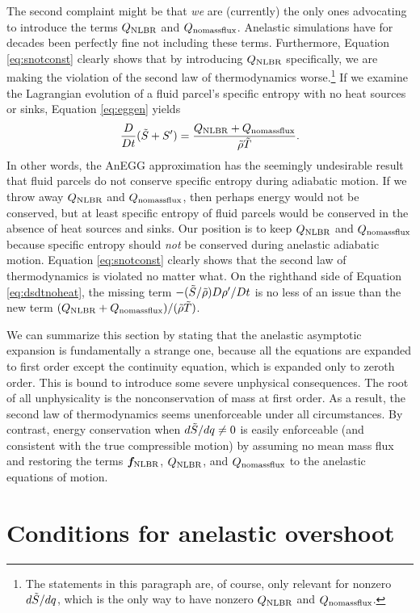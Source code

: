 \documentclass[12pt]{article}
\newcommand{\heatnlbr}{Q_{\rm NLBR}}
\newcommand{\forcenlbr}{\bm{f}_{\rm NLBR}}
\newcommand{\heatnomassflux}{Q_{\rm nomassflux}}
\begin{document}
The second complaint might be that \textit{we} are (currently) the only ones advocating to introduce the terms $\heatnlbr$ and $\heatnomassflux$. Anelastic simulations have for decades been perfectly fine not including these terms. Furthermore, Equation \eqref{eq:snotconst} clearly shows that by introducing $\heatnlbr$ specifically, we are making the violation of the second law of thermodynamics worse.\footnote{The statements in this paragraph are, of course, only relevant for nonzero $d\tilde{S}/dq$, which is the only way to have nonzero $\heatnlbr$ and $\heatnomassflux$.} If we examine the Lagrangian evolution of a fluid parcel's specific entropy with no heat sources or sinks, Equation \eqref{eq:eggen} yields 
\begin{align}\label{eq:dsdtnoheat}
	\frac{D}{Dt}(\entrtilde + \entrprime) = \frac{\heatnlbr+\heatnomassflux}{\rhotilde\tmptilde}.
\end{align}
In other words, the AnEGG approximation has the seemingly undesirable result that fluid parcels do not conserve specific entropy during adiabatic motion. If we throw away $\heatnlbr$ and $\heatnomassflux$, then perhaps energy would not be conserved, but at least specific entropy of fluid parcels would be conserved in the absence of heat sources and sinks. Our position is to keep $\heatnlbr$ and $\heatnomassflux$ because specific entropy should \textit{not} be conserved during anelastic adiabatic motion. Equation \eqref{eq:snotconst} clearly shows that the second law of thermodynamics is violated no matter what. On the righthand side of Equation \eqref{eq:dsdtnoheat}, the missing term $-(\tilde{S}/\tilde{\rho})D{\rho^\prime}/Dt$ is no less of an issue than the new term $(\heatnlbr+\heatnomassflux)/(\rhotilde\tmptilde)$. 

We can summarize this section by stating that the anelastic asymptotic expansion is fundamentally a strange one, because all the equations are expanded to first order except the continuity equation, which is expanded only to zeroth order. This is bound to introduce some severe unphysical consequences. The root of all unphysicality is the nonconservation of mass at first order. As a result, the second law of thermodynamics seems unenforceable under all circumstances. By contrast, energy conservation when $d\tilde{S}/dq\neq0$ is easily enforceable (and consistent with the true compressible motion) by assuming no mean mass flux and restoring the terms $\forcenlbr$, $\heatnlbr$, and $\heatnomassflux$ to the anelastic equations of motion. 

\section{Conditions for anelastic overshoot}\label{sec:overshoot}
\end{document}
